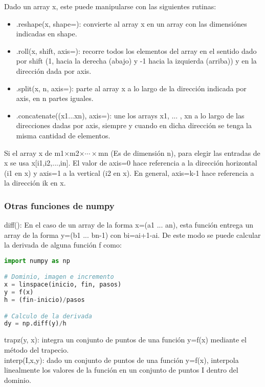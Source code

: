 \documentclass[10pt,oneside]{article}
\begin{document}
\begin{multicols}{2}
                Dado un array x, este puede manipularse con las siguientes rutinas:

                \begin{itemize}
                    \item .reshape(x, shape=): convierte al array x en un array con las dimensiónes indicadas en shape.
                    \item .roll(x, shift, axis=): recorre todos los elementos del array en el sentido dado por shift (1, hacia la derecha (abajo) y -1 hacia la izquierda (arriba)) y en la dirección dada por axis.
                    \item .split(x, n, axis=): parte al array x a lo largo de la dirección indicada por axis, en n partes iguales.
                    \item .concatenate((x1...xn), axis=): une los arrays x1, ... , xn a lo largo de las direcciones dadas por axis, siempre y cuando en dicha dirección se tenga la misma cantidad de elementos.
                \end{itemize}

                Si el array x de m1$\times$m2$\times\cdots\times$mn (Es de dimensión n), para elegir las entradas de x se usa x[i1,i2,...,in]. El valor de axis=0 hace referencia a la dirección horizontal (i1 en x) y axis=1 a la vertical (i2 en x). En general, axis=k-1 hace referencia a la dirección ik en x.

                \subsubsection{Otras funciones de numpy}

                diff(): En el caso de un array de la forma x=(a1 ... an), esta función entrega un array de la forma y=(b1 ... bn-1) con bi=ai+1-ai. De este modo se puede calcular la derivada de alguna función f como:

                \begin{lstlisting}[language=Python]
import numpy as np

# Dominio, imagen e incremento
x = linspace(inicio, fin, pasos)
y = f(x)
h = (fin-inicio)/pasos

# Calculo de la derivada
dy = np.diff(y)/h
                \end{lstlisting}

                trapz(y, x): integra un conjunto de puntos de una función y=f(x) mediante el método del trapecio.\\ \newline
                interp(I,x,y): dado un conjunto de puntos de una función y=f(x), interpola linealmente los valores de la función en un conjunto de puntos I dentro del dominio.


\end{multicols}
\end{document}
